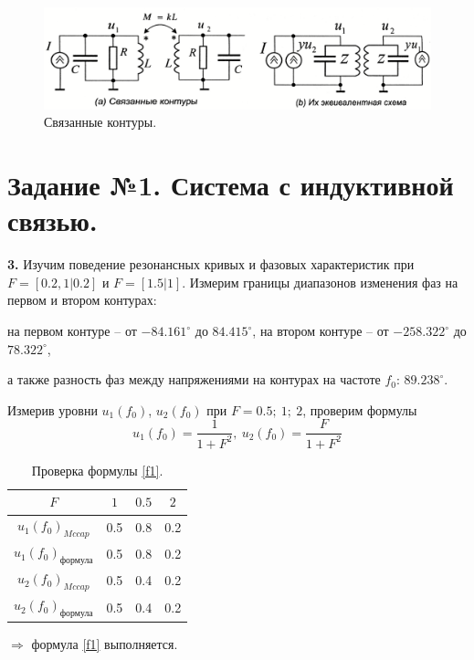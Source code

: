 \documentclass[a4paper, 12pt, twoside]{article}
\begin{document}
\begin{figure}[H]
	\centering
	\includegraphics[width =  0.9\linewidth]{cvk}
	\caption{Связанные контуры.}
\end{figure}

\section*{Задание №1. Система с индуктивной связью.}

\textbf{3.} Изучим поведение резонансных кривых и фазовых характеристик при $F = [0.2, 1|0.2]$ и $F = [1.5|1]$. Измерим границы диапазонов изменения фаз на первом и втором контурах: 

на первом контуре -- от $-84.161^{\circ}$ до $84.415^{\circ}$, на втором контуре -- от $-258.322^{\circ}$ до $78.322^{\circ}$,

а также разность фаз между напряжениями на контурах на частоте $f_0$: $89.238^{\circ}$.

Измерив уровни $u_1(f_0)$, $u_2(f_0)$ при $F = 0.5;~1;~2$, проверим формулы 
\begin{equation}
\label{f1}
u_1(f_0) = \frac{1}{1+F^2},~u_2(f_0)= \frac{F}{1+F^2}
\end{equation}

\begin{table}[H]
	\centering
	\caption{Проверка формулы \eqref{f1}.}
	\begin{tabular}{c|ccc} \toprule
		$F$                         & $1$ & $0.5$ & $2$ \\ \midrule
		$u_1(f_0)_{Mccap}$          & 0.5 & 0.8   & 0.2 \\
		$u_1(f_0)_{\text{формула}}$ & 0.5 & 0.8   & 0.2 \\
		$u_2(f_0)_{Mccap}$          & 0.5 & 0.4   & 0.2 \\
		$u_2(f_0)_{\text{формула}}$ & 0.5 & 0.4   & 0.2 \\ \bottomrule
	\end{tabular}
\end{table}

$\Longrightarrow$ формула \eqref{f1} выполняется.

~
\end{document}

